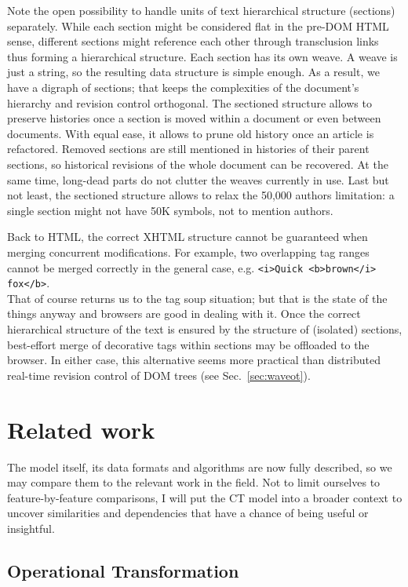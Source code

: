 \documentclass{sig-alternate}
\begin{document}
Note the open possibility to handle units of text hierarchical structure (sections) separately.
While each section might be considered flat in the pre-DOM HTML sense, different sections might reference each other through transclusion links thus forming a hierarchical structure.
Each section has its own weave. A weave is just a string, so the resulting data structure is simple enough.
As a result, we have a digraph of sections; that keeps the complexities of the document's hierarchy and revision control orthogonal. 
The sectioned structure allows to preserve histories once a section is moved within a document or even between documents.
With equal ease, it allows to prune old history once an article is refactored.
Removed sections are still mentioned in histories of their parent sections, so historical revisions of the whole document can be recovered. At the same time, long-dead parts do not clutter the weaves currently in use.
Last but not least, the sectioned structure allows to relax the 50,000 authors limitation: a single section might not have 50K symbols, not to mention authors.

Back to HTML, the correct XHTML structure cannot be guaranteed when merging concurrent modifications. For example, two overlapping tag ranges cannot be merged correctly in the general case, e.g. 
{\small \verb+<i>Quick <b>brown</i> fox</b>+. }\\
That of course returns us to the tag soup situation; but that is the state of the things anyway and  browsers are good in dealing with it. 
Once the correct hierarchical structure of the text is ensured by the structure of (isolated) sections, best-effort merge of decorative tags within sections may be offloaded to the browser.
In either case, this alternative seems more practical than distributed real-time revision control of DOM trees (see Sec.~\ref{sec:waveot}).


\section{Related work} \label{sec:reflections}

The model itself, its data formats and algorithms are now fully described, so we may compare them to the relevant work in the field.
Not to limit ourselves to feature-by-feature comparisons, I will put the CT model into a broader context to uncover similarities and dependencies that have a chance of being useful or insightful.

\subsection{Operational Transformation} \label{sec:ot}
\end{document}
